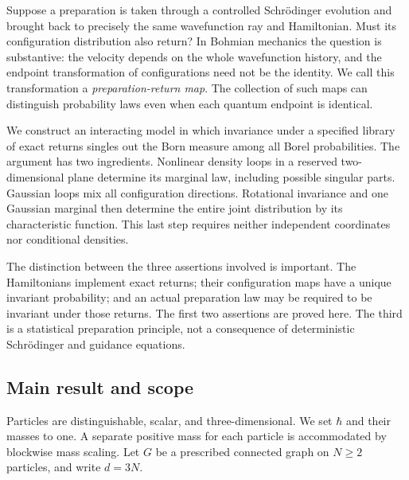 \documentclass[11pt]{article}
\numberwithin{equation}{section}
\theoremstyle{definition}
\begin{document}
Suppose a preparation is taken through a controlled Schr\"odinger evolution
and brought back to precisely the same wavefunction ray and Hamiltonian.
Must its configuration distribution also return? In Bohmian mechanics the
question is substantive: the velocity depends on the whole wavefunction
history, and the endpoint transformation of configurations need not be the
identity. We call this transformation a \emph{preparation-return map}.
The collection of such maps can distinguish probability laws even when
each quantum endpoint is identical.

We construct an interacting model in which invariance under a specified
library of exact returns singles out the Born measure among all Borel
probabilities. The argument has two ingredients. Nonlinear density loops
in a reserved two-dimensional plane determine its marginal law, including
possible singular parts. Gaussian loops mix all configuration directions.
Rotational invariance and one Gaussian marginal then determine the entire
joint distribution by its characteristic function. This last step requires
neither independent coordinates nor conditional densities.

The distinction between the three assertions involved is important.
The Hamiltonians implement exact returns; their configuration maps have a
unique invariant probability; and an actual preparation law may be required
to be invariant under those returns. The first two assertions are proved
here. The third is a statistical preparation principle, not a consequence
of deterministic Schr\"odinger and guidance equations.

\subsection{Main result and scope}

Particles are distinguishable, scalar, and three-dimensional. We set
$\hbar$ and their masses to one. A separate positive mass for each particle
is accommodated by blockwise mass scaling. Let $G$ be a prescribed connected
graph on $N\geq2$ particles, and write $d=3N$.
\end{document}
